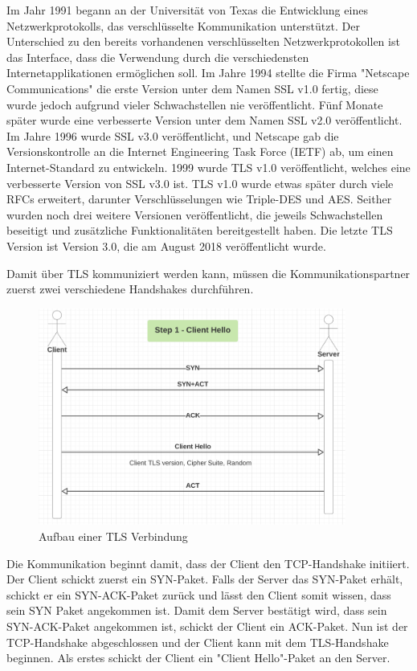 Im Jahr 1991 begann an der Universität von Texas die Entwicklung eines Netzwerkprotokolls, das verschlüsselte Kommunikation unterstützt. Der Unterschied zu den bereits vorhandenen verschlüsselten Netzwerkprotokollen ist das Interface, dass die Verwendung durch die verschiedensten Internetapplikationen ermöglichen soll. Im Jahre 1994 stellte die Firma "Netscape Communications" die erste Version unter dem Namen SSL v1.0 fertig, diese wurde jedoch aufgrund vieler Schwachstellen nie veröffentlicht. Fünf Monate später wurde eine verbesserte Version unter dem Namen SSL v2.0 veröffentlicht. Im Jahre 1996 wurde SSL v3.0 veröffentlicht, und Netscape gab die Versionskontrolle an die Internet Engineering Task Force (IETF) ab, um einen Internet-Standard zu entwickeln. 1999 wurde TLS v1.0 veröffentlicht, welches eine verbesserte Version von SSL v3.0 ist. TLS v1.0 wurde etwas später durch viele RFCs erweitert, darunter Verschlüsselungen wie Triple-DES und AES. Seither wurden noch drei weitere Versionen veröffentlicht, die jeweils Schwachstellen beseitigt und zusätzliche Funktionalitäten bereitgestellt haben. Die letzte TLS Version ist Version 3.0, die am August 2018 veröffentlicht wurde. \cite{WikiTLS} 

Damit über TLS kommuniziert werden kann, müssen die Kommunikationspartner zuerst zwei verschiedene Handshakes durchführen. 

\begin{figure}[H]
    \centering
    \includegraphics[width=0.9\textwidth]{media/OpenSSL/VerbindungsAufbau.png}
    \caption{Aufbau einer TLS Verbindung \cite{DeepDiveTLS}}
\end{figure}

Die Kommunikation beginnt damit, dass der Client den TCP-Handshake initiiert. Der Client schickt zuerst ein SYN-Paket. Falls der Server das SYN-Paket erhält, schickt er ein SYN-ACK-Paket zurück und lässt den Client somit wissen, dass sein SYN Paket angekommen ist. Damit dem Server bestätigt wird, dass sein SYN-ACK-Paket angekommen ist, schickt der Client ein ACK-Paket. Nun ist der TCP-Handshake abgeschlossen und der Client kann mit dem TLS-Handshake beginnen. Als erstes schickt der Client ein "Client Hello"-Paket an den Server.

